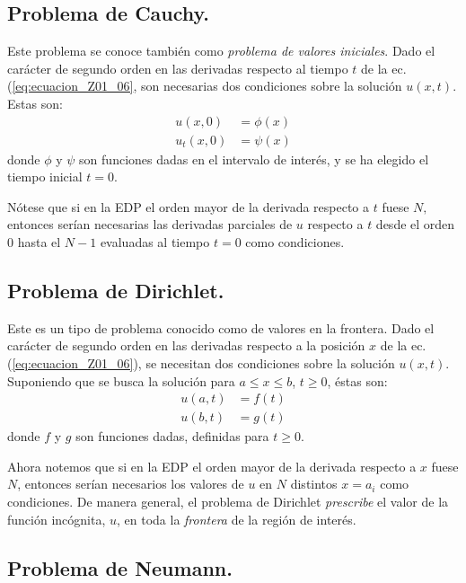 \subsection{Problema de Cauchy.}
Este problema se conoce también como \emph{problema de valores iniciales}. Dado el carácter de segundo orden en las derivadas respecto al tiempo $t$ de la ec. (\ref{eq:ecuacion_Z01_06}, son necesarias dos condiciones sobre la solución $u(x, t)$. Estas son:
\begin{align}
u(x, 0) &= \phi (x) \label{eq:ecuacion_Z01_07} \\[0.5em]
u_{t}(x, 0) &= \psi (x) \label{eq:ecuacion_Z01_08}
\end{align}
donde $\phi$ y $\psi$ son funciones dadas en el intervalo de interés, y se ha elegido el tiempo inicial $t = 0$.
\par
Nótese que si en la EDP el orden mayor de la derivada respecto a $t$ fuese $N,$ entonces serían necesarias las derivadas parciales de $u$ respecto a $t$ desde el orden $0$ hasta el $N - 1$ evaluadas al tiempo $t = 0$ como condiciones.

\subsection{Problema de Dirichlet.}

Este es un tipo de problema conocido como de valores en la frontera. Dado el carácter de segundo orden en las derivadas respecto a la posición $x$ de la ec. (\ref{eq:ecuacion_Z01_06}), se necesitan dos condiciones sobre la solución $u(x, t)$. Suponiendo que se busca la solución para $a  \leq x \leq b$, $t \geq 0$, éstas son:
\begin{align}
u(a, t) &= f (t) \label{eq:ecuacion_Z01_09} \\[0.5em]
u(b, t) &= g(t) \label{eq:ecuacion_Z01_10}
\end{align}
donde $f$ y $g$ son funciones dadas, definidas para $t \geq 0$.
\par
Ahora notemos que si en la EDP el orden mayor de la derivada respecto a $x$ fuese $N$, entonces serían necesarios los valores de $u$ en $N$ distintos $x = a_{i}$ como condiciones. De manera general, el problema de Dirichlet \emph{prescribe} el valor de la función incógnita, $u$, en toda la \emph{frontera} de la región de interés.

\subsection{Problema de Neumann.}

